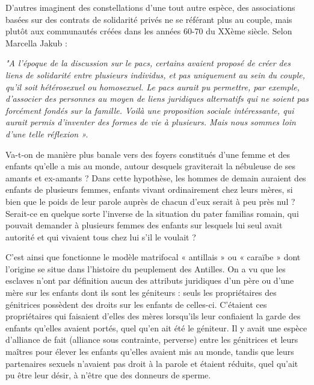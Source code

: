 D'autres imaginent des constellations d'une tout autre espèce, des associations basées sur des contrats de solidarité privés ne se référant plus au couple, mais plutôt aux communautés créées dans les années 60-70 du XXème siècle. Selon Marcella Jakub :
\begin{displayquote}  
\emph{"A l'époque de la discussion sur le pacs, certains avaient proposé de créer des liens de solidarité entre plusieurs individus, et pas uniquement au sein du couple, qu'il soit hétérosexuel ou homosexuel. Le pacs aurait pu permettre, par exemple, d'associer des personnes au moyen de liens juridiques alternatifs qui ne soient pas forcément fondés sur la famille. Voilà une proposition sociale intéressante, qui aurait permis d'inventer des formes de vie à plusieurs. Mais nous sommes loin d'une telle réflexion ».}
\end{displayquote}
 Va-t-on de manière plus banale vers des foyers constitués d'une femme et des enfants qu'elle a mis au monde, autour desquels graviterait la nébuleuse de ses amants et ex-amants ? Dans cette hypothèse, les hommes de demain auraient des enfants de plusieurs femmes, enfants vivant ordinairement chez leurs mères, si bien que le poids de leur parole auprès de chacun d'eux serait à peu près nul ? Serait-ce en quelque sorte l'inverse de la situation du pater familias romain, qui pouvait demander à plusieurs femmes des enfants sur lesquels lui seul avait autorité et qui vivaient tous chez lui s’il le voulait ?
 
 
 C'est ainsi que fonctionne le modèle matrifocal « antillais » ou « caraïbe » dont l'origine se situe dans l'histoire du peuplement des Antilles. On a vu que les esclaves n'ont par définition aucun des attributs juridiques d'un père ou d'une mère sur les enfants dont ils sont les géniteurs : seuls les propriétaires des génitrices possèdent des droits sur les enfants de celles-ci. C'étaient ces propriétaires qui faisaient d'elles des mères lorsqu'ils leur confiaient la garde des enfants qu'elles avaient portés, quel qu'en ait été le géniteur. Il y avait une espèce d'alliance de fait (alliance sous contrainte, perverse) entre les génitrices et leurs maîtres pour élever les enfants qu'elles avaient mis au monde, tandis que leurs partenaires sexuels n'avaient pas droit à la parole et étaient réduits, quel qu'ait pu être leur désir,  à n'être que des donneurs de sperme. 
 
 



